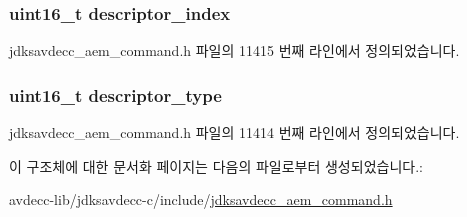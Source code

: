\subsubsection[{\texorpdfstring{descriptor\+\_\+index}{descriptor_index}}]{\setlength{\rightskip}{0pt plus 5cm}uint16\+\_\+t descriptor\+\_\+index}\hypertarget{structjdksavdecc__aem__command__get__stream__info_a042bbc76d835b82d27c1932431ee38d4}{}\label{structjdksavdecc__aem__command__get__stream__info_a042bbc76d835b82d27c1932431ee38d4}


jdksavdecc\+\_\+aem\+\_\+command.\+h 파일의 11415 번째 라인에서 정의되었습니다.

\subsubsection[{\texorpdfstring{descriptor\+\_\+type}{descriptor_type}}]{\setlength{\rightskip}{0pt plus 5cm}uint16\+\_\+t descriptor\+\_\+type}\hypertarget{structjdksavdecc__aem__command__get__stream__info_ab7c32b6c7131c13d4ea3b7ee2f09b78d}{}\label{structjdksavdecc__aem__command__get__stream__info_ab7c32b6c7131c13d4ea3b7ee2f09b78d}


jdksavdecc\+\_\+aem\+\_\+command.\+h 파일의 11414 번째 라인에서 정의되었습니다.



이 구조체에 대한 문서화 페이지는 다음의 파일로부터 생성되었습니다.\+:\begin{DoxyCompactItemize}
\item 
avdecc-\/lib/jdksavdecc-\/c/include/\hyperlink{jdksavdecc__aem__command_8h}{jdksavdecc\+\_\+aem\+\_\+command.\+h}\end{DoxyCompactItemize}
